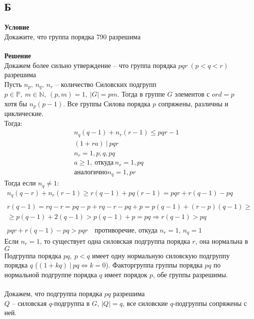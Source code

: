 		\subsection*{Б}
		\textbf{Условие}\\
		Докажите, что группа порядка 790 разрешима\\
		\\
		\textbf{Решение}\\
		Докажем более сильно утверждение -- что группа порядка $pqr\ (p<q<r)$ разрешима\\
		Пусть $n_{p},\ n_{q},\ n_{r}$ -- количество Силовских подгрупп\\
		$p \in \mathbb{P},\ m \in \mathbb{N},\ (p,m) = 1,\ |G| = pm$. Тогда в группе $G$ элементов с $ord = p$ хотя бы $n_p (p-1)$. Все группы Силова порядка $p$ сопряжены, различны и циклические.\\
		Тогда:
		\begin{gather*}
			n_q (q-1) + n_r (r-1) \leqslant pqr-1\\
			(1 + ra)\ |\ pqr\\
			n_r = 1,p,q,pq\\
			a \geqslant 1,\ \text{откуда}\ n_r = 1,pq\\
			\text{аналогично} n_q = 1, pr
		\end{gather*}
		Тогда если $n_q \ne 1$:
		\begin{gather*}
			n_{q} (q-r) + n_{r}(r-1) \geqslant r(q-1) + pq(r-1) = pqr + r(q-1) - pq\\
			\\
			r(q-1) = rq - r = pq - p + rq - r - pq + p = p(q-1) + (r-p)(q-1) \geqslant \\
			\geqslant p(q-1) + 2(q-1) > p(q-1) + p = pq \Rightarrow r(q-1) > pq\\
			\\
			pqr + r(q-1) -pq > pqr\quad \text{противоречие, откуда $n_r = 1$, $n_q= 1$}
		\end{gather*}
		Если $n_{r} = 1$, то существует одна силовская подгруппа порядка $r$, она нормальна в $G$\\
		Подгруппа порядка $pq,\ p<q$ имеет одну нормальную силовскую подгруппу порядка $q$ ($(1 + kq)\ |\ pq \Leftrightarrow k = 0$). Факторгруппа группы порядка $pq$ по нормальной подгруппе порядка $q$ имеет порядок $p$, обе группы разрешимы.\\
		\\
		Докажем, что подгруппа порядка $pq$ разрешима\\
		$Q$ -- силовская $q$-подгруппа в $G$, $|Q| = q$, все силовские $q$-подгруппы сопряжены с ней.\\
